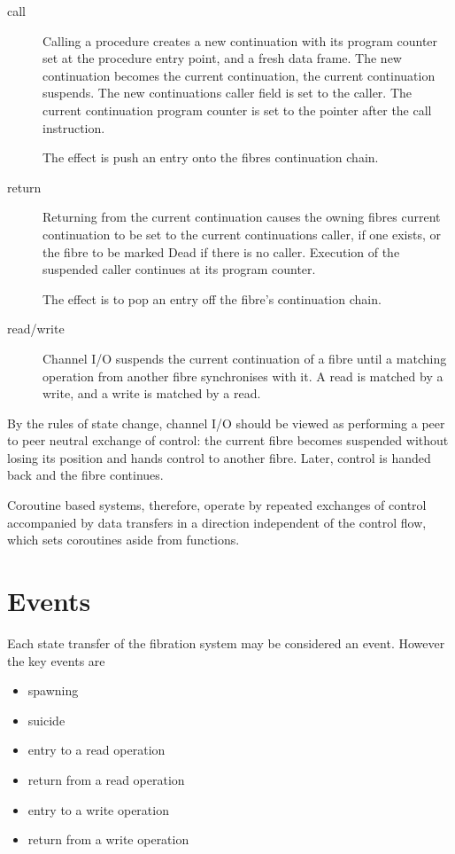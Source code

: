 \documentclass[oneside]{book}
\begin{document}
\begin{description}
\item[call] Calling a procedure creates a new continuation
with its program counter set at the procedure entry point,
and a fresh data frame. The new continuation becomes the
current continuation, the current continuation suspends.
The new continuations caller field is set to the caller.
The current continuation program counter is set
to the pointer after the call instruction.

The effect is push an entry onto the fibres continuation chain.

\item[return] Returning from the current continuation causes
the owning fibres current continuation to be set to the
current continuations caller, if one exists, or the 
fibre to be marked Dead if there is no caller. Execution
of the suspended caller continues at its program counter.

The effect is to pop an entry off the fibre's continuation chain.

\item[read/write] Channel I/O suspends the current continuation
of a fibre until a matching operation from another fibre
synchronises with it. A read is matched by a write, and a write
is matched by a read.
\end{description}

By the rules of state change, channel I/O should be viewed
as performing a peer to peer neutral exchange of control:
the current fibre becomes suspended without losing its position
and hands control to another fibre. Later, control is handed
back and the fibre continues.

Coroutine based systems, therefore, operate by repeated exchanges
of control accompanied by data transfers in a direction independent
of the control flow, which sets coroutines aside from functions.

\section{Events}
Each state transfer of the fibration system may be considered
an event. However the key events are
\begin{itemize}
\item spawning
\item suicide
\item entry to a read operation
\item return from a read operation
\item entry to a write operation
\item return from a write operation
\end{itemize}
\end{document}
